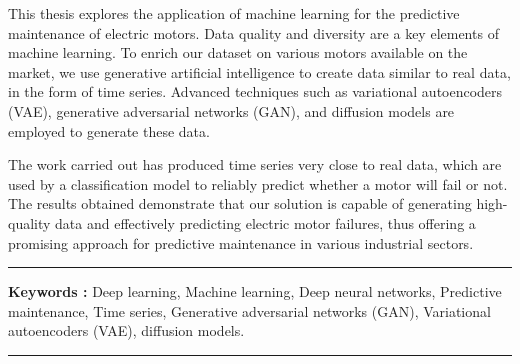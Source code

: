 \medskip

This thesis explores the application of machine learning for the predictive
maintenance of electric motors. Data quality  and diversity  are a key elements of machine
learning. To enrich our dataset on various motors available on the market, we
use generative artificial intelligence to create data similar to real data, in
the form of time series. Advanced techniques such as variational autoencoders
(VAE), generative adversarial networks (GAN), and diffusion models 
are employed to generate these data.

\medskip

The work carried out has produced time series very close to real data, which
are used by a classification model to reliably predict whether a motor will
fail or not. The results obtained demonstrate that our solution is capable of
generating high-quality data and effectively predicting electric motor
failures, thus offering a promising approach for predictive maintenance in
various industrial sectors.

\vspace{1cm}

\noindent\rule[2pt]{\textwidth}{0.5pt}

{\textbf{Keywords :}}
Deep learning, Machine learning, Deep neural networks, Predictive maintenance,
Time series, Generative adversarial networks (GAN), Variational autoencoders (VAE), diffusion models.
\\

\noindent\rule[2pt]{\textwidth}{0.5pt}

